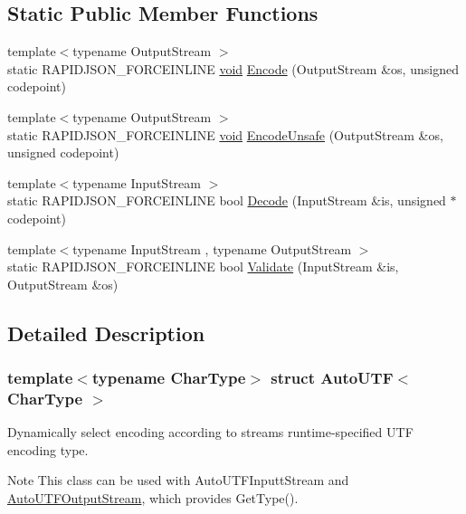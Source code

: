 \subsection*{Static Public Member Functions}
\begin{DoxyCompactItemize}
\item 
{\footnotesize template$<$typename Output\+Stream $>$ }\\static R\+A\+P\+I\+D\+J\+S\+O\+N\+\_\+\+F\+O\+R\+C\+E\+I\+N\+L\+I\+NE \hyperlink{imgui__impl__opengl3__loader_8h_ac668e7cffd9e2e9cfee428b9b2f34fa7}{void} \hyperlink{structAutoUTF_a414946115261f886e74dd42cb4b98781}{Encode} (Output\+Stream \&os, unsigned codepoint)
\item 
{\footnotesize template$<$typename Output\+Stream $>$ }\\static R\+A\+P\+I\+D\+J\+S\+O\+N\+\_\+\+F\+O\+R\+C\+E\+I\+N\+L\+I\+NE \hyperlink{imgui__impl__opengl3__loader_8h_ac668e7cffd9e2e9cfee428b9b2f34fa7}{void} \hyperlink{structAutoUTF_a05f5dcd1f153b61b763e44ed452de251}{Encode\+Unsafe} (Output\+Stream \&os, unsigned codepoint)
\item 
{\footnotesize template$<$typename Input\+Stream $>$ }\\static R\+A\+P\+I\+D\+J\+S\+O\+N\+\_\+\+F\+O\+R\+C\+E\+I\+N\+L\+I\+NE bool \hyperlink{structAutoUTF_aa5e3c1dc23dbb75f6442ff69500a35b0}{Decode} (Input\+Stream \&is, unsigned $\ast$codepoint)
\item 
{\footnotesize template$<$typename Input\+Stream , typename Output\+Stream $>$ }\\static R\+A\+P\+I\+D\+J\+S\+O\+N\+\_\+\+F\+O\+R\+C\+E\+I\+N\+L\+I\+NE bool \hyperlink{structAutoUTF_a36dd6f226d6a07c12161e21c0aff20b1}{Validate} (Input\+Stream \&is, Output\+Stream \&os)
\end{DoxyCompactItemize}


\subsection{Detailed Description}
\subsubsection*{template$<$typename Char\+Type$>$\newline
struct Auto\+U\+T\+F$<$ Char\+Type $>$}

Dynamically select encoding according to stream\textquotesingle{}s runtime-\/specified U\+TF encoding type. 

\begin{DoxyNote}{Note}
This class can be used with Auto\+U\+T\+F\+Inputt\+Stream and \hyperlink{classAutoUTFOutputStream}{Auto\+U\+T\+F\+Output\+Stream}, which provides Get\+Type(). 
\end{DoxyNote}


